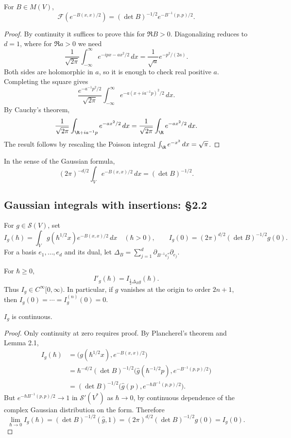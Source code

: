 \begin{lemma}
For $B\in M(V)$,
\[
\mathcal F\left(e^{-B(x,x)/2}\right)
=(\det B)^{-1/2}e^{-B^{-1}(p,p)/2}.
\]
\end{lemma}
\begin{proof}
By continuity it suffices to prove this for $\Re B>0$. Diagonalizing reduces to $d=1$, where for $\Re a>0$ we need
\[
\frac1{\sqrt{2\pi}}\int_{-\infty}^{\infty}e^{-ipx-ax^2/2}\,dx
=\frac1{\sqrt a}e^{-p^2/(2a)}.
\]
Both sides are holomorphic in $a$, so it is enough to check real positive $a$. Completing the square gives
\[
\frac{e^{-a^{-1}p^2/2}}{\sqrt{2\pi}}
\int_{-\infty}^{\infty}e^{-a(x+ia^{-1}p)^2/2}\,dx.
\]
By Cauchy's theorem,
\[
\frac1{\sqrt{2\pi}}\int_{\R+ia^{-1}p}e^{-ax^2/2}\,dx
=\frac1{\sqrt{2\pi}}\int_\R e^{-ax^2/2}\,dx.
\]
The result follows by rescaling the Poisson integral $\int_\R e^{-x^2}\,dx=\sqrt\pi$.
\end{proof}
In the sense of the Gaussian formula,
\[
(2\pi)^{-d/2}\int_V e^{-B(x,x)/2}\,dx=(\det B)^{-1/2}.
\]

\subsection*{Gaussian integrals with insertions: §2.2}
For $g\in\mathcal S(V)$, set
\[
I_g(\hbar)=\int_V g(\hbar^{1/2}x)e^{-B(x,x)/2}\,dx\quad(\hbar>0),
\qquad I_g(0)=(2\pi)^{d/2}(\det B)^{-1/2}g(0).
\]
For a basis $e_1,\ldots,e_d$ and its dual, let $\Delta_B=\sum_{j=1}^d\partial_{B^{-1}e_j^*}\partial_{e_j}$.

\begin{theorem}[Theorem 2.2]
For $\hbar\ge0$,
\[
I'_g(\hbar)=I_{\frac12\Delta_Bg}(\hbar).
\]
Thus $I_g\in C^\infty[0,\infty)$. In particular, if $g$ vanishes at the origin to order $2n+1$, then $I_g(0)=\cdots=I_g^{(n)}(0)=0$.
\end{theorem}

\begin{lemma}[Lemma 2.3]
$I_g$ is continuous.
\end{lemma}
\begin{proof}
Only continuity at zero requires proof. By Plancherel's theorem and Lemma 2.1,
\[
\begin{aligned}
I_g(\hbar)
&=\bigl(g(\hbar^{1/2}x),e^{-B(x,x)/2}\bigr)\\
&=\hbar^{-d/2}(\det B)^{-1/2}
\bigl(\widehat g(\hbar^{-1/2}p),e^{-B^{-1}(p,p)/2}\bigr)\\
&=(\det B)^{-1/2}\bigl(\widehat g(p),e^{-\hbar B^{-1}(p,p)/2}\bigr).
\end{aligned}
\]
But $e^{-\hbar B^{-1}(p,p)/2}\to1$ in $\mathcal S'(V^*)$ as $\hbar\to0$, by continuous dependence of the complex Gaussian distribution on the form. Therefore
\[
\lim_{\hbar\to0}I_g(\hbar)
=(\det B)^{-1/2}(\widehat g,1)
=(2\pi)^{d/2}(\det B)^{-1/2}g(0)=I_g(0).
\]
\end{proof}

